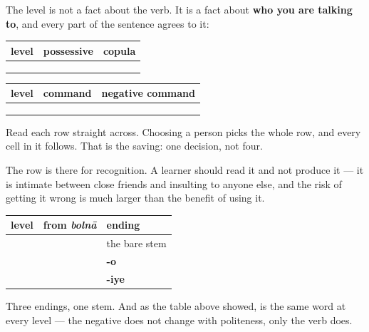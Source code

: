 \begin{grammarlens}[title={Grammar Lens: the same choice, made four times}]
The level is not a fact about the verb. It is a fact about \textbf{who you are talking to}, and every part of the sentence agrees to it:

\noindent
\begin{tabularx}{\linewidth}{@{}>{\raggedright\arraybackslash}X>{\raggedright\arraybackslash}X>{\raggedright\arraybackslash}X@{}}
\toprule
\textbf{level} & \textbf{possessive} & \textbf{copula} \\
\midrule
\hi{तू} & \hi{तेरा} & \hi{है} \\
\hi{तुम} & \hi{तुम्हारा} & \textbf{\hi{हो}} \\
\hi{आप} & \hi{आपका} & \hi{हैं} \\
\bottomrule
\end{tabularx}

\noindent
\begin{tabularx}{\linewidth}{@{}>{\raggedright\arraybackslash}X>{\raggedright\arraybackslash}X>{\raggedright\arraybackslash}X@{}}
\toprule
\textbf{level} & \textbf{command} & \textbf{negative command} \\
\midrule
\hi{तू} & \hi{बोल} & \hi{मत} \hi{बोल} \\
\hi{तुम} & \textbf{\hi{बोलो}} & \hi{मत} \hi{बोलो} \\
\hi{आप} & \textbf{\hi{बोलिए}} & \hi{मत} \hi{बोलिए} \\
\bottomrule
\end{tabularx}

Read each row straight across. Choosing a person picks the whole row, and every cell in it follows. That is the saving: one decision, not four.

The \textbf{} row is there for recognition. A learner should read it and not produce it — it is intimate between close friends and insulting to anyone else, and the risk of getting it wrong is much larger than the benefit of using it.
\end{grammarlens}

\begin{grammarlens}[title={Grammar Lens: how each command is built}]
\noindent
\begin{tabularx}{\linewidth}{@{}>{\raggedright\arraybackslash}X>{\raggedright\arraybackslash}X>{\raggedright\arraybackslash}X@{}}
\toprule
\textbf{level} & \textbf{from \emph{bolnā}} & \textbf{ending} \\
\midrule
\hi{तू} & \hi{बोल} & the bare stem \\
\hi{तुम} & \hi{बोलो} & \textbf{-o} \\
\hi{आप} & \hi{बोलिए} & \textbf{-iye} \\
\bottomrule
\end{tabularx}

Three endings, one stem. And as the table above showed, \textbf{} is the same word at every level — the negative does not change with politeness, only the verb does.
\end{grammarlens}

